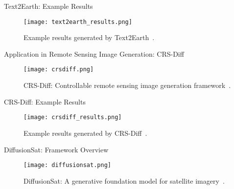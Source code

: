   \begin{refsection}
    \begin{frame}{Text2Earth: Example Results}
      \begin{figure}
        \centering
        \texttt{[image: text2earth\_results.png]}
        \caption[]{\scriptsize Example results generated by Text2Earth~\parencite{text2earth2025}.}
      \end{figure}
      \bottomleftrefs
    \end{frame}
  \end{refsection}
  
  \begin{refsection}
  \begin{frame}{Application in Remote Sensing Image Generation: CRS-Diff}
    \begin{figure}
      \centering
      \texttt{[image: crsdiff.png]}
      \caption[]{\scriptsize CRS-Diff: Controllable remote sensing image generation framework~\parencite{tang2024crsdiff}.}
    \end{figure}
    \bottomleftrefs
  \end{frame}
  \end{refsection}
  
  \begin{refsection}
  \begin{frame}{CRS-Diff: Example Results}
    \begin{figure}
      \centering
      \texttt{[image: crsdiff\_results.png]}
      \caption[]{\scriptsize Example results generated by CRS-Diff~\parencite{tang2024crsdiff}.}
    \end{figure}
    \bottomleftrefs
  \end{frame}
  \end{refsection}
  
  
  \begin{refsection}
  \begin{frame}{DiffusionSat: Framework Overview}
    \begin{figure}
      \centering
      \texttt{[image: diffusionsat.png]}
      \caption[]{\scriptsize DiffusionSat: A generative foundation model for satellite imagery~\parencite{diffusionset2024}.}
    \end{figure}
    \bottomleftrefs
  \end{frame}
  \end{refsection}
  
